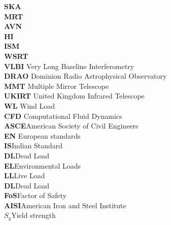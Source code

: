 \large{



\begin{flushleft}


\textbf{SKA}\hspace{1cm}{Square Kilometre Array}\\
\textbf{MRT}\hspace{1cm}{Mauritius Radio Telescope}\\
\textbf{AVN}\hspace{1cm}{African Very Long Baseline Interferometry Network}\\
\textbf{HI}\hspace{1cm}{Neutral hydrogen}\\
\textbf{ISM}\hspace{1cm}{Interstellar Medium}\\
\textbf{WSRT}\hspace{1cm}{Westerbork Synthesis Radio Telescope }\\
\textbf{VLBI}\hspace{1cm} Very Long Baseline Interferometry\\
\textbf{DRAO}\hspace{1cm} Dominion Radio Astrophysical Observatory\\
\textbf{MMT}\hspace{1cm} Multiple Mirror Telescope\\
\textbf{UKIRT}\hspace{1cm} United Kingdom Infrared Telescope\\
\textbf{WL} \hspace{1cm} Wind Load\\
\textbf{CFD}\hspace{1cm} Computational Fluid Dynamics\\
\textbf{ASCE}\hspace{1cm}American Society of Civil Engineers \\
\textbf{EN}\hspace{1CM} European standards\\
\textbf{IS}\hspace{1cm}Indian Standard\\
\textbf{DL}\hspace{1cm}Dead Load \\
\textbf{EL}\hspace{1CM}Environmental Loads\\
\textbf{LL}\hspace{1CM}Live Load \\
\textbf{DL}\hspace{1cm}Dead Load\\
\textbf{FoS}\hspace{1cm}Factor of Safety \\
\textbf{AISI}\hspace{1cm}American Iron and Steel Institute\\
\textbf{\(S_y\)\hspace{1cm}}Yield strength \\











\end{flushleft}}